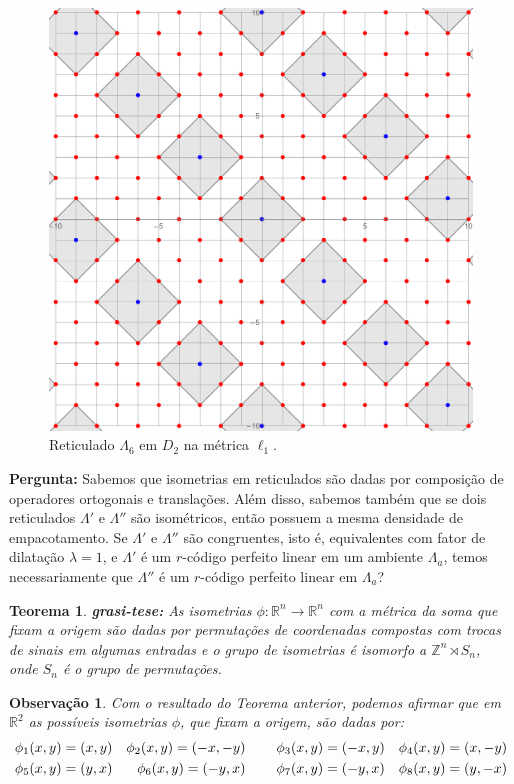 \documentclass{article}
\theoremstyle{plain}
\newtheorem{theorem}{Teorema}
\newtheorem{observation}{Observa\c{c}\~ao}
\theoremstyle{definition}
\theoremstyle{remark}
\begin{document}
\begin{figure}[ht]
  \centering
  \includegraphics[scale=0.23]{notperfect.pdf}
  \caption{Reticulado $\Lambda_6$ em $D_2$ na métrica $\ell_1$.}
\end{figure}

\hspace{-0.5cm}\textbf{Pergunta:} Sabemos que isometrias em reticulados são dadas por composição de operadores ortogonais e translações. Além disso, sabemos também que se dois reticulados $\Lambda'$ e $\Lambda''$ são isométricos, então possuem a mesma densidade de empacotamento. Se $\Lambda'$ e $\Lambda''$ são congruentes, isto é, equivalentes com fator de dilatação $\lambda=1$, e $\Lambda'$ é um $r$-código perfeito linear em um ambiente $\Lambda_a$, temos necessariamente que $\Lambda''$ é um $r$-código perfeito linear em $\Lambda_a$?

\begin{theorem}
  \textbf{grasi-tese: }As isometrias $\phi: \mathbb{R}^n \to \mathbb{R}^n$ com a métrica da soma que fixam a origem são dadas por permutações de coordenadas compostas com trocas de sinais em 
algumas entradas e o grupo de isometrias é isomorfo a $\mathbb{Z}^n \rtimes S_n$, onde $S_n$ é o grupo de permutações. 
\end{theorem}

\begin{observation}
  Com o resultado do Teorema anterior, podemos afirmar que em $\mathbb{R}^2$ as possíveis isometrias $\phi$, que fixam a origem, são dadas por:
  \begin{align*}
    \centering
     &\phi_1(x,y) = (x,y) &\phi_2(x,y) = (-x,-y)\;\;\;\;\;\;\;\;  &\phi_3(x,y) = (-x,y) &\phi_4(x,y) = (x,-y) \\
     &\phi_5(x,y) = (y,x) &\phi_6(x,y) = (-y,x)\;\;\;\;\;\;\;\;  &\phi_7(x,y) = (-y,x) &\phi_8(x,y) = (y,-x) 
  \end{align*}

\end{observation}
\end{document}
